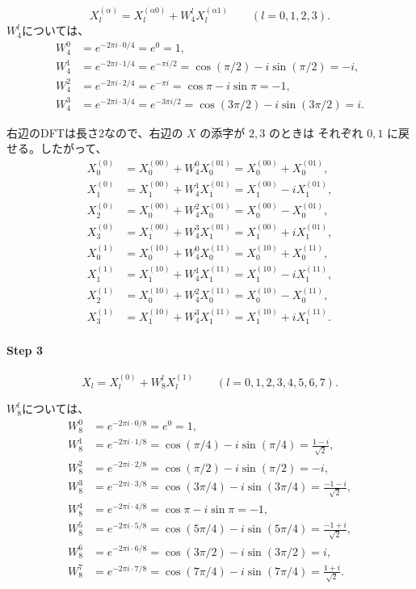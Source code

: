 \documentclass[a4j]{jarticle}
\begin{document}
\[
X_l^{(\alpha)}
= X_l^{(\alpha0)} + W_4^l X_l^{(\alpha1)}
\qquad (l=0,1,2,3).
\]
$W_4^l$については、
\[
\begin{aligned}
W_4^0 &= e^{-2\pi i\cdot 0/4}=e^0=1,\\
W_4^1 &= e^{-2\pi i\cdot 1/4}=e^{-\pi i/2}
       =\cos(\pi/2)-i\sin(\pi/2)=-i,\\
W_4^2 &= e^{-2\pi i\cdot 2/4}=e^{-\pi i}
       =\cos\pi-i\sin\pi=-1,\\
W_4^3 &= e^{-2\pi i\cdot 3/4}=e^{-3\pi i/2}
       =\cos(3\pi/2)-i\sin(3\pi/2)=i.
\end{aligned}
\]

右辺のDFTは長さ2なので、右辺の $X$ の添字が $2,3$ のときは
それぞれ $0,1$ に戻せる。したがって、
\[
\begin{aligned}
X_0^{(0)} &= X_0^{(00)} + W_4^0 X_0^{(01)}
           = X_0^{(00)} + X_0^{(01)},\\
X_1^{(0)} &= X_1^{(00)} + W_4^1 X_1^{(01)}
           = X_1^{(00)} - iX_1^{(01)},\\
X_2^{(0)} &= X_0^{(00)} + W_4^2 X_0^{(01)}
           = X_0^{(00)} - X_0^{(01)},\\
X_3^{(0)} &= X_1^{(00)} + W_4^3 X_1^{(01)}
           = X_1^{(00)} + iX_1^{(01)},\\[4pt]
X_0^{(1)} &= X_0^{(10)} + W_4^0 X_0^{(11)}
           = X_0^{(10)} + X_0^{(11)},\\
X_1^{(1)} &= X_1^{(10)} + W_4^1 X_1^{(11)}
           = X_1^{(10)} - iX_1^{(11)},\\
X_2^{(1)} &= X_0^{(10)} + W_4^2 X_0^{(11)}
           = X_0^{(10)} - X_0^{(11)},\\
X_3^{(1)} &= X_1^{(10)} + W_4^3 X_1^{(11)}
           = X_1^{(10)} + iX_1^{(11)}.
\end{aligned}
\]

\paragraph{Step 3}

\[
X_l = X_l^{(0)} + W_8^l X_l^{(1)}
\qquad (l=0,1,2,3,4,5,6,7).
\]

$W_8^l$については、
\[
\begin{aligned}
W_8^0 &= e^{-2\pi i\cdot 0/8}=e^0=1,\\
W_8^1 &= e^{-2\pi i\cdot 1/8}
       =\cos(\pi/4)-i\sin(\pi/4)=\frac{1-i}{\sqrt{2}},\\
W_8^2 &= e^{-2\pi i\cdot 2/8}
       =\cos(\pi/2)-i\sin(\pi/2)=-i,\\
W_8^3 &= e^{-2\pi i\cdot 3/8}
       =\cos(3\pi/4)-i\sin(3\pi/4)=\frac{-1-i}{\sqrt{2}},\\
W_8^4 &= e^{-2\pi i\cdot 4/8}
       =\cos\pi-i\sin\pi=-1,\\
W_8^5 &= e^{-2\pi i\cdot 5/8}
       =\cos(5\pi/4)-i\sin(5\pi/4)=\frac{-1+i}{\sqrt{2}},\\
W_8^6 &= e^{-2\pi i\cdot 6/8}
       =\cos(3\pi/2)-i\sin(3\pi/2)=i,\\
W_8^7 &= e^{-2\pi i\cdot 7/8}
       =\cos(7\pi/4)-i\sin(7\pi/4)=\frac{1+i}{\sqrt{2}}.
\end{aligned}
\]
\end{document}
